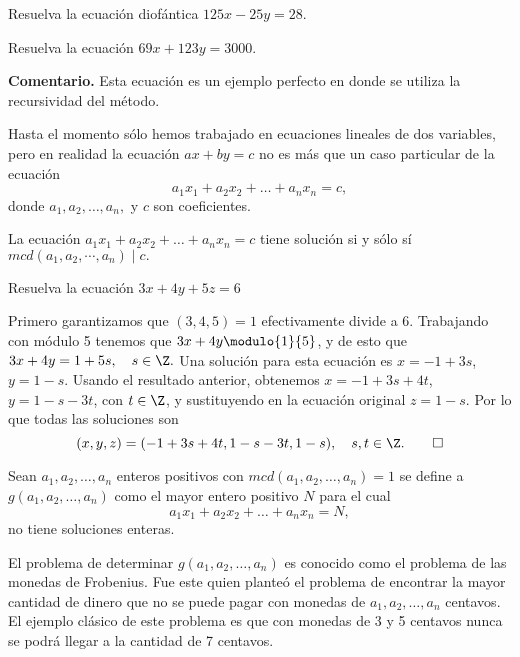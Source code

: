 \begin{example}
    Resuelva la ecuación diofántica $125x-25y=28.$
\end{example}

\begin{example}
    Resuelva la ecuación $69x+123y=3000.$
\end{example}
\par\textbf{\textup{Comentario.}} Esta ecuación es un ejemplo perfecto en donde se utiliza la recursividad del método.

Hasta el momento sólo hemos trabajado en ecuaciones lineales de dos variables, pero en realidad la ecuación $ax+by=c$ no es más que un caso particular de la ecuación
\[
    a_1 x_1 + a_2 x_2 + \ldots + a_n x_n = c,
\]
donde $a_1, a_2, \dots, a_n,$ y $c$ son coeficientes.

\begin{theorem.box}{}{}
    La ecuación $a_1 x_1 + a_2 x_2 + \ldots + a_n x_n = c$ tiene solución si y sólo sí $mcd(a_1,a_2,\cdots,a_n) \mid c.$
\end{theorem.box}

\begin{example}
    Resuelva la ecuación $3x+4y+5z=6$
\end{example}
\begin{solution}
    Primero garantizamos que $(3,4,5)=1$ efectivamente divide a 6.
    Trabajando con módulo 5 tenemos que $3x+4y\modulo{1}{5}$, y de esto que $3x+4y=1+5s, \quad s \in \Z.$
    Una solución para esta ecuación es $x=-1+3s$, $y=1-s$.
    Usando el resultado anterior, obtenemos $x=-1+3s+4t$, $y = 1-s-3t$, con $t \in \Z$, y sustituyendo en la ecuación original $z=1-s$.
    Por lo que todas las soluciones son
    \[
        (x,y,z)=(-1+3s+4t,1-s-3t,1-s), \quad s,t \in \Z.\qedhere
    \]
\end{solution}

\begin{definition.box}{}{}
    Sean  $a_1,a_2,\ldots,a_n$ enteros positivos con $mcd(a_1,a_2,\ldots,a_n)=1$ se define a $g(a_1,a_2,\ldots,a_n)$
    como el mayor entero positivo $N$ para el cual
    \[
        a_1 x_1 + a_2 x_2 + \ldots + a_n x_n = N,
    \]
    no tiene soluciones enteras.
\end{definition.box}
El problema de determinar $g(a_1,a_2,\ldots,a_n)$ es conocido como el problema de las monedas de Frobenius.
Fue este quien planteó el problema de encontrar la mayor cantidad de dinero que no se puede pagar con monedas de $a_1, a_2,\ldots,a_n$ centavos.
El ejemplo clásico de este problema es que con monedas de 3 y 5 centavos nunca se podrá llegar a la cantidad de 7 centavos.

